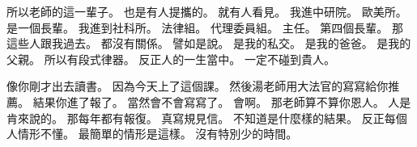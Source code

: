 \hypertarget{c01:cue:3888}{}所以老師的這一輩子。
\hypertarget{c01:cue:3889}{}也是有人提攜的。
\hypertarget{c01:cue:3890}{}就有人看見。
\hypertarget{c01:cue:3891}{}我進中研院。
\hypertarget{c01:cue:3892}{}歐美所。
\hypertarget{c01:cue:3893}{}是一個長輩。
\hypertarget{c01:cue:3894}{}我進到社科所。
\hypertarget{c01:cue:3895}{}法律組。
\hypertarget{c01:cue:3896}{}代理委員組。
\hypertarget{c01:cue:3897}{}主任。
\hypertarget{c01:cue:3898}{}第四個長輩。
\hypertarget{c01:cue:3899}{}那這些人跟我過去。
\hypertarget{c01:cue:3900}{}都沒有關係。
\hypertarget{c01:cue:3901}{}譬如是說。
\hypertarget{c01:cue:3902}{}是我的私交。
\hypertarget{c01:cue:3903}{}是我的爸爸。
\hypertarget{c01:cue:3904}{}是我的父親。
\hypertarget{c01:cue:3905}{}所以有段式律器。
\hypertarget{c01:cue:3906}{}反正人的一生當中。
\hypertarget{c01:cue:3907}{}一定不碰到貴人。

\hypertarget{c01:cue:3908}{}像你剛才出去讀書。
\hypertarget{c01:cue:3909}{}因為今天上了這個課。
\hypertarget{c01:cue:3910}{}然後湯老師用大法官的寫寫給你推薦。
\hypertarget{c01:cue:3911}{}結果你進了報了。
\hypertarget{c01:cue:3912}{}當然會不會寫寫了。
\hypertarget{c01:cue:3913}{}會啊。
\hypertarget{c01:cue:3914}{}那老師算不算你恩人。
\hypertarget{c01:cue:3915}{}人是肯來說的。
\hypertarget{c01:cue:3916}{}那每年都有報復。
\hypertarget{c01:cue:3917}{}真寫規見信。
\hypertarget{c01:cue:3918}{}不知道是什麼樣的結果。
\hypertarget{c01:cue:3919}{}反正每個人情形不懂。
\hypertarget{c01:cue:3920}{}最簡單的情形是這樣。
\hypertarget{c01:cue:3921}{}沒有特別少的時間。

